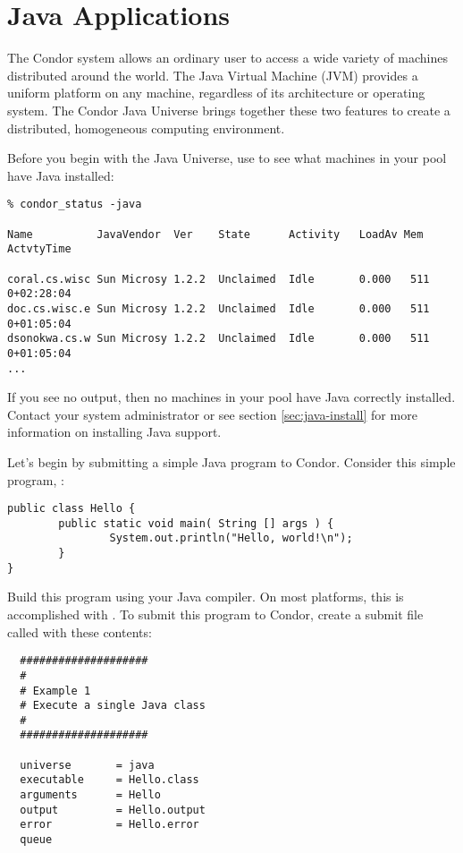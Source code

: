 
\section{\label{sec:Java}Java Applications}

The Condor system allows an ordinary user to access a wide variety of
machines distributed around the world.  The Java Virtual Machine (JVM)
provides a uniform platform on any machine, regardless of its architecture
or operating system.  The Condor Java Universe brings together these
two features to create a distributed, homogeneous computing environment.

Before you begin with the Java Universe, use  to see what
machines in your pool have Java installed:

\begin{verbatim}
% condor_status -java

Name          JavaVendor  Ver    State      Activity   LoadAv Mem   ActvtyTime

coral.cs.wisc Sun Microsy 1.2.2  Unclaimed  Idle       0.000   511  0+02:28:04
doc.cs.wisc.e Sun Microsy 1.2.2  Unclaimed  Idle       0.000   511  0+01:05:04
dsonokwa.cs.w Sun Microsy 1.2.2  Unclaimed  Idle       0.000   511  0+01:05:04
...
\end{verbatim}

If you see no output, then no machines in your pool have Java correctly
installed.  Contact your system administrator or see section \ref{sec:java-install}
for more information on installing Java support.

Let's begin by submitting a simple Java program to Condor.
Consider this simple program, :

\begin{verbatim}
public class Hello {
        public static void main( String [] args ) {
                System.out.println("Hello, world!\n");
        }
}
\end{verbatim}

Build this program using your Java compiler.  On most platforms, this is
accomplished with .  To submit this program to
Condor, create a submit file called  with these contents:

\begin{verbatim}
  ####################
  #
  # Example 1
  # Execute a single Java class
  #
  ####################

  universe       = java
  executable     = Hello.class
  arguments      = Hello
  output         = Hello.output
  error          = Hello.error
  queue
\end{verbatim}

